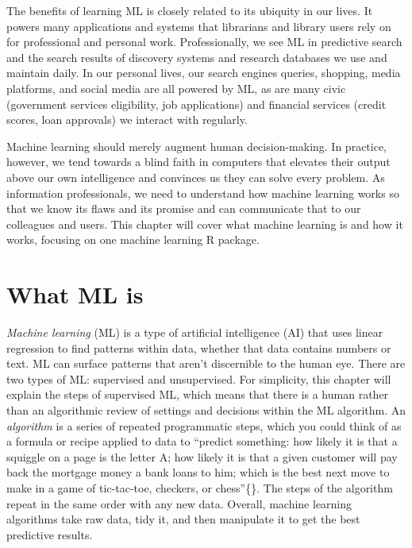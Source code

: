 \documentclass[
  krantz2]{krantz}
\begin{document}
The benefits of learning ML is closely related to its ubiquity in our lives. It powers many applications and systems that librarians and library users rely on for professional and personal work. Professionally, we see ML in predictive search and the search results of discovery systems and research databases we use and maintain daily. In our personal lives, our search engines queries, shopping, media platforms, and social media are all powered by ML, as are many civic (government services eligibility, job applications) and financial services (credit scores, loan approvals) we interact with regularly.

Machine learning should merely augment human decision-making. In practice, however, we tend towards a blind faith in computers that elevates their output above our own intelligence and convinces us they can solve every problem. As information professionals, we need to understand how machine learning works so that we know its flaws and its promise and can communicate that to our colleagues and users. This chapter will cover what machine learning is and how it works, focusing on one machine learning R package.

\hypertarget{what-ml-is}{%
\section{What ML is}\label{what-ml-is}}

\emph{Machine learning} (ML) is a type of artificial intelligence (AI) that uses linear regression to find patterns within data, whether that data contains numbers or text. ML can surface patterns that aren't discernible to the human eye. There are two types of ML: supervised and unsupervised. For simplicity, this chapter will explain the steps of supervised ML, which means that there is a human rather than an algorithmic review of settings and decisions within the ML algorithm. An \emph{algorithm} is a series of repeated programmatic steps, which you could think of as a formula or recipe applied to data to ``predict something: how likely it is that a squiggle on a page is the letter A; how likely it is that a given customer will pay back the mortgage money a bank loans to him; which is the best next move to make in a game of tic-tac-toe, checkers, or chess''\{\citet{broussard2018}\}. The steps of the algorithm repeat in the same order with any new data. Overall, machine learning algorithms take raw data, tidy it, and then manipulate it to get the best predictive results.
\end{document}
